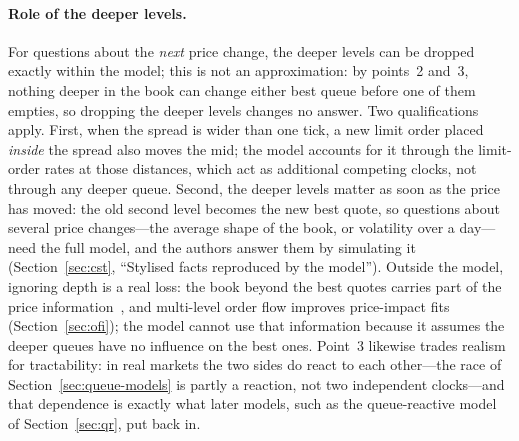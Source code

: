 \paragraph{Role of the deeper levels.} For questions about the \emph{next} price change, the deeper
levels can be dropped exactly within the model; this is not an approximation: by points~2 and~3,
nothing deeper in the book can change either best queue before one of them empties, so dropping the
deeper levels changes no answer.
Two qualifications apply. First, when the spread is wider than one tick, a new limit order placed
\emph{inside} the spread also moves the mid; the model accounts for it through the limit-order rates at
those distances, which act as additional competing clocks, not through any deeper queue. Second, the
deeper levels matter as soon as the price has moved: the old second level becomes the new best quote, so
questions about several price changes---the average shape of the book, or volatility over a day---need
the full model, and the authors answer them by simulating it (Section~\ref{sec:cst}, ``Stylised facts reproduced by the
model''). Outside the model, ignoring depth is a real loss: the book beyond the best quotes carries
part of the price information~\citep{cao2009}, and multi-level order flow improves price-impact fits
(Section~\ref{sec:ofi}); the model cannot use that information because it assumes the deeper queues have
no influence on the best ones. Point~3 likewise trades realism for tractability: in real markets the two sides do
react to each other---the race of Section~\ref{sec:queue-models} is partly a reaction, not two
independent clocks---and that dependence is exactly what later models, such as the queue-reactive model
of Section~\ref{sec:qr}, put back in.

